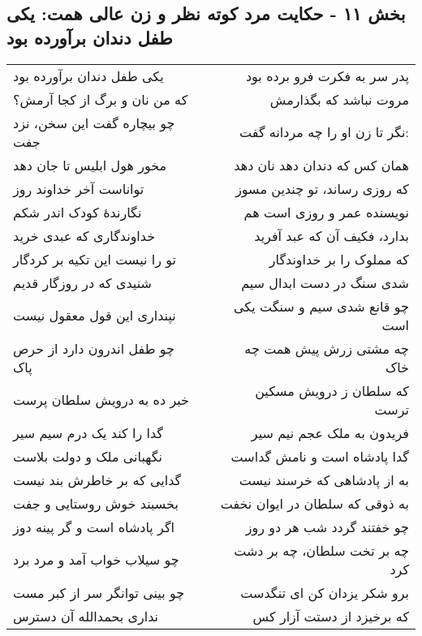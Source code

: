 \begin{center}
\section*{بخش ۱۱ - حکایت مرد کوته نظر و زن عالی همت: یکی طفل دندان برآورده بود}
\label{sec:011}
\begin{longtable}{l p{0.5cm} r}
یکی طفل دندان برآورده بود
&&
پدر سر به فکرت فرو برده بود
\\
که من نان و برگ از کجا آرمش؟
&&
مروت نباشد که بگذارمش
\\
چو بیچاره گفت این سخن، نزد جفت
&&
نگر تا زن او را چه مردانه گفت:
\\
مخور هول ابلیس تا جان دهد
&&
همان کس که دندان دهد نان دهد
\\
تواناست آخر خداوند روز
&&
که روزی رساند، تو چندین مسوز
\\
نگارندهٔ کودک اندر شکم
&&
نویسنده عمر و روزی است هم
\\
خداوندگاری که عبدی خرید
&&
بدارد، فکیف آن که عبد آفرید
\\
تو را نیست این تکیه بر کردگار
&&
که مملوک را بر خداوندگار
\\
شنیدی که در روزگار قدیم
&&
شدی سنگ در دست ابدال سیم
\\
نپنداری این قول معقول نیست
&&
چو قانع شدی سیم و سنگت یکی است
\\
چو طفل اندرون دارد از حرص پاک
&&
چه مشتی زرش پیش همت چه خاک
\\
خبر ده به درویش سلطان پرست
&&
که سلطان ز درویش مسکین ترست
\\
گدا را کند یک درم سیم سیر
&&
فریدون به ملک عجم نیم سیر
\\
نگهبانی ملک و دولت بلاست
&&
گدا پادشاه است و نامش گداست
\\
گدایی که بر خاطرش بند نیست
&&
به از پادشاهی که خرسند نیست
\\
بخسبند خوش روستایی و جفت
&&
به ذوقی که سلطان در ایوان نخفت
\\
اگر پادشاه است و گر پینه دوز
&&
چو خفتند گردد شب هر دو روز
\\
چو سیلاب خواب آمد و مرد برد
&&
چه بر تخت سلطان، چه بر دشت کرد
\\
چو بینی توانگر سر از کبر مست
&&
برو شکر یزدان کن ای تنگدست
\\
نداری بحمدالله آن دسترس
&&
که برخیزد از دستت آزار کس
\\
\end{longtable}
\end{center}
